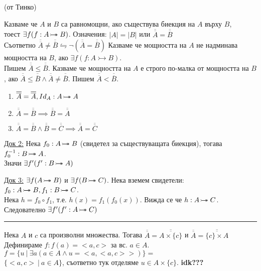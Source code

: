 \documentclass[fleqn, titlepage, 12pt]{report}
\newcommand*\rightbijectionarrow{\mathrel{\ooalign{$\twoheadrightarrow$\cr\hidewidth\hbox{$\rightarrowtail\mkern 1mu$}\cr}}}
\begin{document}
\begin{center}
(от Тинко)
\end{center}

\begin{center}
\end{center}
\bigbreak

 Казваме че $A$ и $B$ са равномощни, ако съществува биекция на $A$ върху $B$,\\
тоест $\exists{f}(f: A \rightbijectionarrow B)$.
Означения: $|A| = |B| $ или $ \overline{\overline{A}} = \overline{\overline{B}}$\\
Съответно $\overline{\overline{A}} \neq \overline{\overline{B}} \leftrightharpoons \lnot(\overline{\overline{A}} = \overline{\overline{B}})$
\bigbreak
Казваме че мощността на $A$ не надминава мощността на $B$, ако $\exists{f}(f: A \rightarrowtail B)$.\\
Пишем $\overline{\overline{A}} \leq \overline{\overline{B}}$.
\bigbreak
Казваме че мощността на $A$ е строго по-малка от мощността на $B$, ако $\overline{\overline{A}} \leq \overline{\overline{B}} \land \overline{\overline{A}} \neq \overline{\overline{B}}$. Пишем $\overline{\overline{A}} < \overline{\overline{B}}$.

\begin{enumerate}
  \item $\overline{\overline{A}} = \overline{\overline{A}}, Id_A: A \rightbijectionarrow A$
  \item $\overline{\overline{A}} = \overline{\overline{B}} \implies \overline{\overline{B}} = \overline{\overline{A}}$
  \item $\overline{\overline{A}} = \overline{\overline{B}} \land \overline{\overline{B}} = \overline{\overline{C}}
    \implies \overline{\overline{A}} = \overline{\overline{C}}$
\end{enumerate}

\underline{Док 2:} Нека $f_0: A \rightbijectionarrow B$ (свидетел за съществуващата биекция), тогава $f_0^{-1}: B \rightbijectionarrow A$.\\
Значи $\exists{f'}(f': B \rightbijectionarrow A)$
\bigbreak

\underline{Док 3:} $\exists{f}(A \rightbijectionarrow B)$ и $ \exists{f}(B \rightbijectionarrow C)$. Нека вземем
свидетели: $f_0: A \rightbijectionarrow B, f_1: B \rightbijectionarrow C$. \\
Нека $h = f_0 \circ f_1$, т.е. $h(x) = f_1(f_0(x))$. Вижда се че $h: A \rightbijectionarrow C$.
Следователно $\exists{f'}(f': A \rightbijectionarrow C)$
\bigbreak
\hrule
\bigbreak
Нека $A$ и $c$ са произволни множества. Тогава $\overline{\overline{A}} = \overline{\overline{A \times \{ c \} }}$
и $\overline{\overline{A}} = \overline{\overline{\{ c \} \times  A}}$\\
Дефинираме $f: f(a) = <a,c>$ за вс. $a \in A$.
$f = \{u\ |\ \exists{a}(a \in A \land u = <a,<a,c>>)\} =$ \\
$\{<a,c>\ |\ a \in A\}$, съответно тук отделяме $u \in A \times \{ c \}$. \textbf{idk???}
\bigbreak
\end{document}
